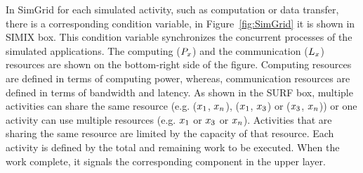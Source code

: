 In SimGrid for each simulated activity, such as computation or data transfer, there is a corresponding condition variable, in Figure~\ref{fig:SimGrid} it is shown in SIMIX box. This condition variable synchronizes the concurrent processes of the simulated applications. The computing (\($$P_{x}$$\)) and the communication (\($$L_{x}$$\)) resources are shown on the bottom-right side of the figure. Computing resources are defined in terms of computing power, whereas, communication resources are defined in terms of bandwidth and latency. As shown in the SURF box, multiple activities can share the same resource (e.g. (\($$x_{1}$$\), \($$x_{n}$$\)), (\($$x_{1}$$\), \($$x_{3}$$\)) or (\($$x_{3}$$\), \($$x_{n}$$\))) or one activity can use multiple resources (e.g. \($$x_{1}$$\) or \($$x_{3}$$\) or  \($$x_{n}$$\)). Activities that are sharing the same resource are limited by the capacity of that resource. Each activity is defined by the total and remaining work to be executed. When the work complete, it signals the corresponding component in the upper layer.



